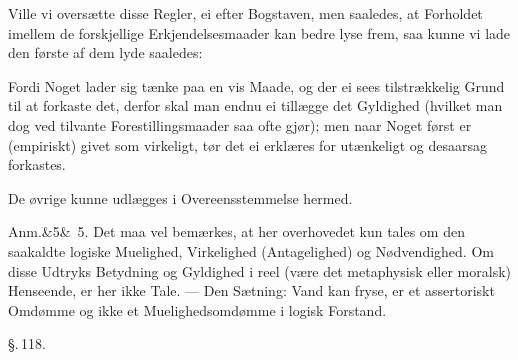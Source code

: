 \documentclass[12pt]{book}
\def\sperr#1{#1}%
\def\textit#1{#1}%
\def\emph#1{#1}%
\newcommand{\sperr}[1]{\textls[180]{#1}}
\newcommand{\parag}[1]{%
  \par\vspace{0.9\baselineskip}%
  {\centering\textit{\S.\,#1.}\par}%
  \vspace{0.35\baselineskip}%
  \noindent\hspace{\parindent}\ignorespaces
}
\newcommand{\anm}[1]{%
  \par\vspace{0.5\baselineskip}%
  \noindent\hspace{\parindent}\sperr{Anm.}\ifx&#1&\else~\textit{#1}.\fi
  \enspace\ignorespaces
}
\newcommand{\opage}[1]{\marginnote{\footnotesize\textit{[#1]}}}
\begin{document}
Ville vi oversætte disse Regler, ei efter Bogstaven, men saaledes, at Forholdet imellem de
forskjellige Erkjendelsesmaader kan bedre lyse frem, saa kunne vi lade den første af dem
lyde saaledes:

Fordi Noget lader sig tænke paa en vis Maade, og der ei sees tilstrækkelig Grund til at
forkaste det, derfor skal man endnu ei tillægge det Gyldighed (hvilket man dog ved tilvante
Forestillingsmaader saa ofte gjør); men naar Noget først er (empiriskt) givet som virkeligt,
tør det ei erklæres for utænkeligt og desaarsag forkastes.

\opage{286} De øvrige kunne udlægges i Overeensstemmelse hermed.

\anm{5} Det maa vel bemærkes, at her overhovedet kun tales om den saakaldte \emph{logiske}
Muelighed, Virkelighed (Antagelighed) og Nødvendighed. Om disse Udtryks Betydning og
Gyldighed i reel (være det metaphysisk eller moralsk) Henseende, er her ikke Tale. --- Den
Sætning: \emph{Vand kan fryse}, er et \emph{assertoriskt} Omdømme og ikke et
Muelighedsomdømme i \emph{logisk Forstand}.

\parag{118}
\end{document}

